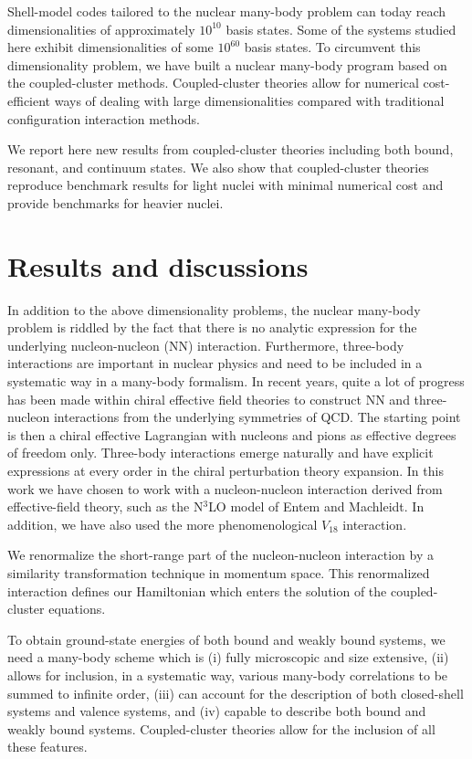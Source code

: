 \documentclass{ws-procs975x65}
\begin{document}
Shell-model codes tailored to the nuclear 
many-body problem can today reach dimensionalities of approximately $10^{10}$ basis states. Some of the systems studied
here exhibit dimensionalities of some $10^{60}$ basis states.
To circumvent this dimensionality problem, we have built a nuclear many-body
program based on the coupled-cluster methods. Coupled-cluster theories allow for numerical cost-efficient ways of
dealing with large dimensionalities compared with traditional configuration interaction methods.

We report here new results from coupled-cluster theories including  both bound, resonant, and continuum
states\cite{hagen1,hagen2,hagen3,hagen4}.  
We also show that coupled-cluster theories reproduce benchmark results for light nuclei with minimal numerical cost  
and  provide benchmarks for heavier nuclei.


\section{Results and discussions}

In addition to the above dimensionality problems, the nuclear many-body problem is riddled by the fact that
there is no analytic expression for the underlying nucleon-nucleon (NN) interaction. 
Furthermore, three-body interactions are
important in nuclear physics and need to be included in a systematic way in a many-body formalism.
In recent years, quite a lot of progress has been made within  chiral effective field theories
to construct NN and three-nucleon interactions from the underlying symmetries of QCD.  
The starting point is then a chiral effective Lagrangian with nucleons and pions as effective degrees of freedom only.
Three-body interactions emerge naturally and have explicit expressions at 
every order in the chiral perturbation theory expansion. 
In this work we have chosen to work with a nucleon-nucleon interaction derived from 
effective-field theory,
such as the N$^3$LO model of Entem and Machleidt. 
In addition, we have also used the more phenomenological $V_{18}$ 
interaction. 

We renormalize the short-range part of the nucleon-nucleon interaction by a similarity transformation
technique in momentum space.\cite{hagen4}
This renormalized  interaction defines our  Hamiltonian 
which enters the solution of the coupled-cluster equations. 

To obtain ground-state energies of both bound and 
weakly bound systems, we need a many-body scheme which is
(i) fully microscopic and size extensive, (ii) allows for inclusion, in 
a systematic way, various many-body
correlations to be summed to infinite order, (iii) can account for 
the description of both closed-shell systems and valence systems, 
and  (iv)  capable
to describe both bound and weakly bound systems.
Coupled-cluster theories allow for the inclusion of  all these features. 
\end{document}
